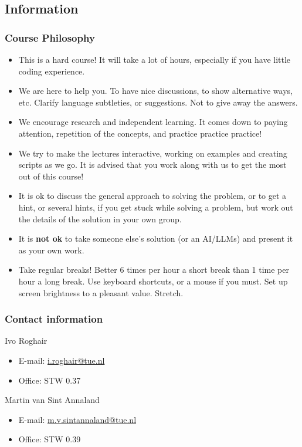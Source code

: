 \subsection{Information}
{\nologo
\begin{frame}
  \frametitle{Course Philosophy}
 \begin{itemize}
  \item This is a hard course! It will take a lot of hours, especially if you have little coding experience.
  \item We are here to help you. To have nice discussions, to show alternative ways, etc. Clarify language subtleties, or suggestions. Not to give away the answers.
  \item We encourage research and independent learning. It comes down to paying attention, repetition of the concepts, and practice practice practice! 
  \item We try to make the lectures interactive, working on examples and creating scripts as we go. It is advised that you work along with us to get the most out of this course!
  \item It is ok to discuss the general approach to solving the problem, or to get a hint, or several hints, if you get stuck while solving a problem, but work out the details of the solution in your own group.
  \item It is {\textbf{not ok}} to take someone else's solution (or an AI/LLMs) and present it as your own work.
  \item Take regular breaks! Better 6 times per hour a short break than 1 time per hour a long break. Use keyboard shortcuts, or a mouse if you must. Set up screen brightness to a pleasant value. Stretch.
\end{itemize}
\end{frame}
}

\begin{frame}
 \frametitle{Contact information}
 \begin{block}{Ivo Roghair}
  \begin{itemize}
   \item E-mail: \href{mailto:i.roghair@tue.nl}{i.roghair@tue.nl}
   \item Office: STW 0.37
   \end{itemize} 
 \end{block}
 \vspace{1em}
  \begin{block}{Martin van Sint Annaland}
  \begin{itemize}
   \item E-mail: \href{mailto:m.v.sintannaland@tue.nl}{m.v.sintannaland@tue.nl}
   \item Office: STW 0.39 
   \end{itemize} 
 \end{block}
\end{frame}

